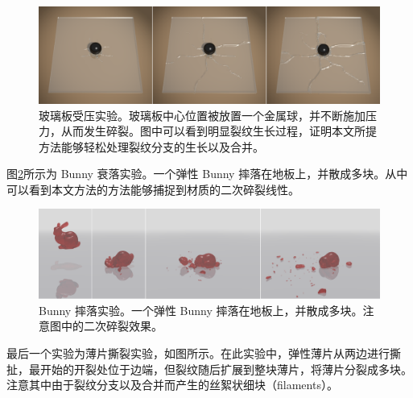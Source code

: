 \begin{figure}[!htb]
  \centering
  \captionsetup{justification=centering}
  \includegraphics[width=\linewidth]{chap/image/demo_brittle_fall}

  \caption{\label{demo_brittle_fall}
           玻璃板受压实验。玻璃板中心位置被放置一个金属球，并不断施加压力，从而发生碎裂。图中可以看到明显裂纹生长过程，证明本文所提方法能够轻松处理裂纹分支的生长以及合并。
          }
\end{figure}

图\ref{demo_fall_bunny}所示为 Bunny 衰落实验。一个弹性 Bunny 摔落在地板上，并散成多块。从中可以看到本文方法的方法能够捕捉到材质的二次碎裂线性。

\begin{figure}[!htb]
  \centering
  \captionsetup{justification=centering}
  \includegraphics[width=\linewidth]{chap/image/demo_fall_bunny}

  \caption{\label{demo_fall_bunny}
           Bunny 摔落实验。一个弹性 Bunny 摔落在地板上，并散成多块。注意图中的二次碎裂效果。
          }
\end{figure}

最后一个实验为薄片撕裂实验，如图所示。在此实验中，弹性薄片从两边进行撕扯，最开始的开裂处位于边端，但裂纹随后扩展到整块薄片，将薄片分裂成多块。注意其中由于裂纹分支以及合并而产生的丝絮状细块（filaments）。

